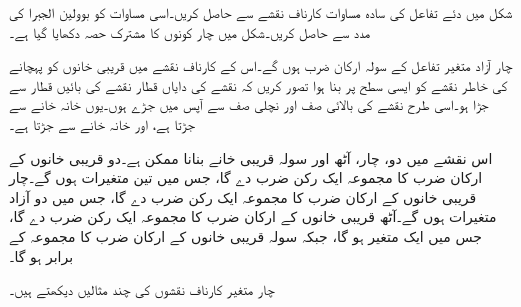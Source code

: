  شکل  میں دئے تفاعل کی سادہ مساوات کارناف نقشے سے حاصل کریں۔اسی مساوات کو بوولین الجبرا کی مدد سے حاصل کریں۔شکل میں چار کونوں کا مشترک حصہ  دکھایا گیا ہے۔ 


چار آزاد متغیر تفاعل کے سولہ ارکان ضرب ہوں گے۔اس کے کارناف نقشے میں قریبی خانوں کو پہچانے کی خاطر نقشے کو ایسی سطح پر بنا ہوا تصور کریں کہ نقشے کی دایاں قطار نقشے کی بائیں قطار سے جڑا ہو۔اسی طرح نقشے کی بالائی صف اور نچلی صف سے آپس میں جڑے ہوں۔یوں  خانہ  خانے سے جڑتا ہے، اور  خانہ  خانے سے جڑتا ہے۔

اس نقشے میں دو، چار، آٹھ اور سولہ قریبی خانے بنانا ممکن ہے۔دو قریبی خانوں کے ارکان ضرب کا مجموعہ ایک رکن ضرب دے گا، جس میں تین متغیرات ہوں گے۔چار قریبی خانوں کے ارکان ضرب کا مجموعہ ایک رکن ضرب دے گا، جس میں دو آزاد متغیرات ہوں گے۔آٹھ قریبی خانوں کے ارکان ضرب کا مجموعہ ایک رکن ضرب دے گا، جس میں ایک متغیر ہو گا، جبکہ سولہ قریبی خانوں کے ارکان ضرب کا مجموعہ  کے برابر ہو گا۔

چار متغیر کارناف نقشوں کی چند مثالیں دیکھتے ہیں۔

